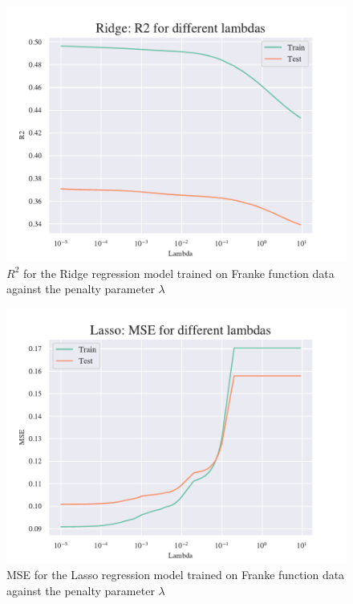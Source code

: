 \begin{figure}[H]
    \centering
    \includegraphics[width=1\linewidth]{project_1/figures/figures_in_appendix/Ridge_R2_Franke_Noise.pdf}
    \caption{$R^2$ for the Ridge regression model trained on Franke function data against the penalty parameter $\lambda$}
    \label{fig:ref3}
\end{figure}

\begin{figure}[H]
    \centering
    \includegraphics[width=1\linewidth]{project_1/figures/figures_in_appendix/Lasso_MSE_Franke_Noise.pdf}
    \caption{MSE for the Lasso regression model trained on Franke function data against the penalty parameter $\lambda$}
    \label{fig:ref4}
\end{figure}

